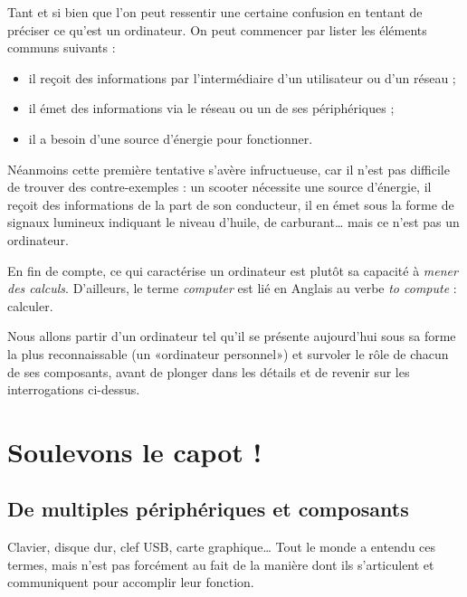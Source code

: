 Tant et si bien que l'on peut ressentir une certaine confusion en tentant de préciser ce qu'est un ordinateur. On peut commencer par lister les éléments communs suivants :
	\begin{itemize}
	\item il reçoit des informations par l'intermédiaire d'un utilisateur ou d'un réseau ;
	\item il émet des informations via le réseau ou un de ses périphériques ;
	\item il a besoin d'une source d'énergie pour fonctionner.
	\end{itemize}
Néanmoins cette première tentative s'avère infructueuse, car il n'est pas difficile de trouver des contre-exemples : un scooter nécessite une source d'énergie, il reçoit des informations de la part de son conducteur, il en émet sous la forme de signaux lumineux indiquant le niveau d'huile, de carburant\dots{} mais ce n'est pas un ordinateur.

En fin de compte, ce qui caractérise un ordinateur est plutôt sa capacité à \emph{mener des calculs}. D'ailleurs, le terme \emph{computer} est lié en Anglais au verbe \emph{to compute} : calculer.

Nous allons partir d'un ordinateur tel qu'il se présente aujourd'hui sous sa forme la plus reconnaissable (un «ordinateur personnel») et survoler le rôle de chacun de ses composants, avant de plonger dans les détails et de revenir sur les interrogations ci-dessus. 
\newpage
\section{Soulevons le capot !}
\subsection{De multiples périphériques et composants}
Clavier, disque dur, clef USB, carte graphique\dots{} Tout le monde a entendu ces termes, mais n'est pas forcément au fait de la manière dont ils s'articulent et communiquent pour accomplir leur fonction.

